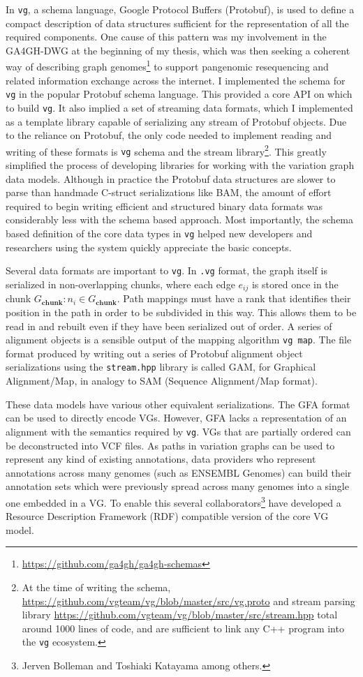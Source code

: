 In {\tt vg}, a schema language, Google Protocol Buffers (Protobuf), is used to define a compact description of data structures sufficient for the representation of all the required components.
One cause of this pattern was my involvement in the GA4GH-DWG at the beginning of my thesis, which was then seeking a coherent way of describing graph genomes\footnote{\url{https://github.com/ga4gh/ga4gh-schemas}} to support pangenomic resequencing and related information exchange across the internet.
I implemented the schema for {\tt vg} in the popular Protobuf schema language.
This provided a core API on which to build {\tt vg}.
It also implied a set of streaming data formats, which I implemented as a template library capable of serializing any stream of Protobuf objects.
Due to the reliance on Protobuf, the only code needed to implement reading and writing of these formats is {\tt vg} schema and the stream library\footnote{At the time of writing the schema, \url{https://github.com/vgteam/vg/blob/master/src/vg.proto} and stream parsing library \url{https://github.com/vgteam/vg/blob/master/src/stream.hpp} total around 1000 lines of code, and are sufficient to link any C++ program into the {\tt vg} ecosystem.}.
This greatly simplified the process of developing libraries for working with the variation graph data models.
Although in practice the Protobuf data structures are slower to parse than handmade C-struct serializations like BAM, the amount of effort required to begin writing efficient and structured binary data formats was considerably less with the schema based approach.
Most importantly, the schema based definition of the core data types in {\tt vg} helped new developers and researchers using the system quickly appreciate the basic concepts.

Several data formats are important to {\tt vg}.
In {\tt .vg} format, the graph itself is serialized in non-overlapping chunks, where each edge $e_{ij}$ is stored once in the chunk $G_\textbf{chunk} : n_i \in G_\textbf{chunk}$.
Path mappings must have a rank that identifies their position in the path in order to be subdivided in this way.
This allows them to be read in and rebuilt even if they have been serialized out of order.
A series of alignment objects is a sensible output of the mapping algorithm {\tt vg map}.
The file format produced by writing out a series of Protobuf alignment object serializations using the {\tt stream.hpp} library is called GAM, for Graphical Alignment/Map, in analogy to SAM (Sequence Alignment/Map format).

These data models have various other equivalent serializations.
The GFA format can be used to directly encode VGs.
However, GFA lacks a representation of an alignment with the semantics required by {\tt vg}.
VGs that are partially ordered can be deconstructed into VCF files.
As paths in variation graphs can be used to represent any kind of existing annotations, data providers who represent annotations across many genomes (such as ENSEMBL Genomes) can build their annotation sets which were previously spread across many genomes into a single one embedded in a VG.
To enable this several collaborators\footnote{Jerven Bolleman and Toshiaki Katayama among others.} have developed a Resource Description Framework (RDF) compatible version of the core VG model.

